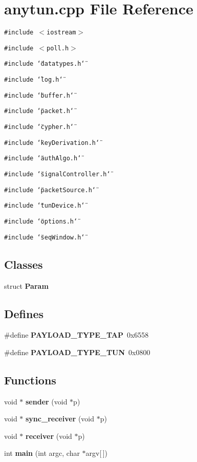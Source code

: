\section{anytun.cpp File Reference}
\label{anytun_8cpp}
{\tt \#include $<$iostream$>$}\par
{\tt \#include $<$poll.h$>$}\par
{\tt \#include \char`\"{}datatypes.h\char`\"{}}\par
{\tt \#include \char`\"{}log.h\char`\"{}}\par
{\tt \#include \char`\"{}buffer.h\char`\"{}}\par
{\tt \#include \char`\"{}packet.h\char`\"{}}\par
{\tt \#include \char`\"{}cypher.h\char`\"{}}\par
{\tt \#include \char`\"{}key\-Derivation.h\char`\"{}}\par
{\tt \#include \char`\"{}auth\-Algo.h\char`\"{}}\par
{\tt \#include \char`\"{}signal\-Controller.h\char`\"{}}\par
{\tt \#include \char`\"{}packet\-Source.h\char`\"{}}\par
{\tt \#include \char`\"{}tun\-Device.h\char`\"{}}\par
{\tt \#include \char`\"{}options.h\char`\"{}}\par
{\tt \#include \char`\"{}seq\-Window.h\char`\"{}}\par
\subsection*{Classes}
\begin{CompactItemize}
\item 
struct {\bf Param}
\end{CompactItemize}
\subsection*{Defines}
\begin{CompactItemize}
\item 
\#define {\bf PAYLOAD\_\-TYPE\_\-TAP}~0x6558
\item 
\#define {\bf PAYLOAD\_\-TYPE\_\-TUN}~0x0800
\end{CompactItemize}
\subsection*{Functions}
\begin{CompactItemize}
\item 
void $\ast$ {\bf sender} (void $\ast$p)
\item 
void $\ast$ {\bf sync\_\-receiver} (void $\ast$p)
\item 
void $\ast$ {\bf receiver} (void $\ast$p)
\item 
int {\bf main} (int argc, char $\ast$argv[$\,$])
\end{CompactItemize}


